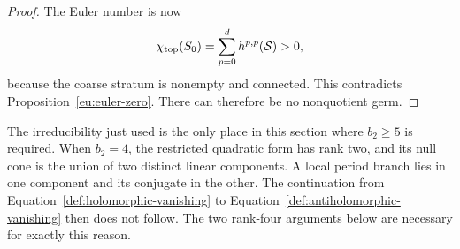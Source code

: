 \begin{proof}
The Euler number is now
\[
             \chi_{\mathrm{top}}(S_0)
                =\sum_{p=0}^d h^{p,p}(\mathcal S)>0,
\]
because the coarse stratum is nonempty and connected.  This
contradicts Proposition~\ref{eu:euler-zero}.  There can therefore
be no nonquotient germ.
\end{proof}

\begin{remark}\label{def:rank-four-boundary}
The irreducibility just used is the only place in this section where
$b_2\geq5$ is required.  When $b_2=4$, the restricted quadratic form
has rank two, and its null cone is the union of two distinct linear
components.  A local period branch lies in one component and its
conjugate in the other.  The continuation from
Equation~\eqref{def:holomorphic-vanishing} to
Equation~\eqref{def:antiholomorphic-vanishing} then does not follow.
The two rank-four arguments below are necessary for exactly this
reason.
\end{remark}
